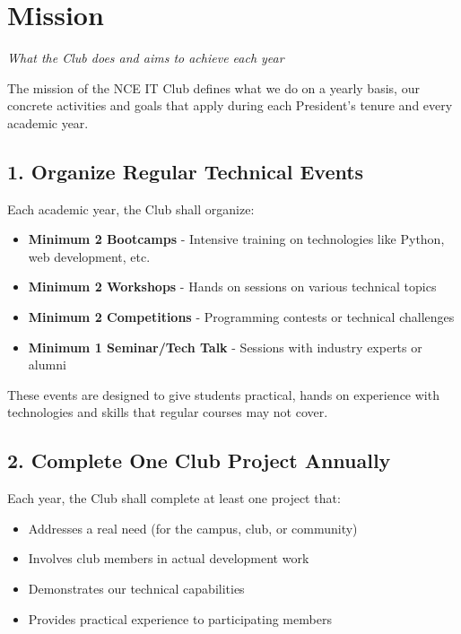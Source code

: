 {}
\section*{Mission}

\textit{What the Club does and aims to achieve each year}

\vspace{0.5cm}

The mission of the NCE IT Club defines what we do on a yearly basis, our concrete activities and goals that apply during each President's tenure and every academic year.

\subsection*{1. Organize Regular Technical Events}

Each academic year, the Club shall organize:

\begin{itemize}[leftmargin=2em, itemsep=0.3em]
    \item \textbf{Minimum 2 Bootcamps} - Intensive training on technologies like Python, web development, etc.
    \item \textbf{Minimum 2 Workshops} - Hands on sessions on various technical topics
    \item \textbf{Minimum 2 Competitions} - Programming contests or technical challenges
    \item \textbf{Minimum 1 Seminar/Tech Talk} - Sessions with industry experts or alumni
\end{itemize}

These events are designed to give students practical, hands on experience with technologies and skills that regular courses may not cover.

\subsection*{2. Complete One Club Project Annually}

Each year, the Club shall complete at least one project that:

\begin{itemize}[leftmargin=2em, itemsep=0.3em]
    \item Addresses a real need (for the campus, club, or community)
    \item Involves club members in actual development work
    \item Demonstrates our technical capabilities
    \item Provides practical experience to participating members
\end{itemize}

